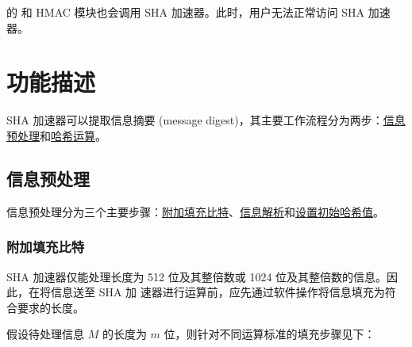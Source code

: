 \documentclass[main\_\_CN.tex]{subfiles}
\begin{document}
\begin{importantlisting}
\vspace{-0.5em}

    \chipname{} 的  和 HMAC 模块也会调用 SHA 加速器。此时，用户无法正常访问 SHA 加速器。
\end{importantlisting}

\section{功能描述}

SHA 加速器可以提取信息摘要 (message digest)，其主要工作流程分为两步：\hyperref[sec:sha-preprocessing]{信息预处理}和\hyperref[sec:sha-hash-operation]{哈希运算}。

\subsection{信息预处理}\label{sec:sha-preprocessing}

信息预处理分为三个主要步骤：\hyperref[sec:sha-padding-msg]{附加填充比特}、\hyperref[sec:sha-parsing-msg]{信息解析}和\hyperref[sec:sha-set-initial-hash]{设置初始哈希值}。

\subsubsection{附加填充比特}\label{sec:sha-padding-msg}

SHA 加速器仅能处理长度为 512 位及其整倍数或 1024 位及其整倍数的信息。因此，在将信息送至 SHA 加
速器进行运算前，应先通过软件操作将信息填充为符合要求的长度。

假设待处理信息 \begin{math} M \end{math} 的长度为 \begin{math} m \end{math} 位，则针对不同运算标准的填充步骤见下：
\end{document}
